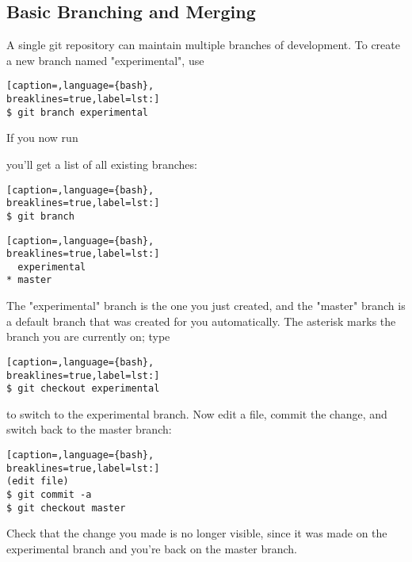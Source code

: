\subsection{Basic Branching and Merging}
A single git repository can maintain multiple branches of development. To
create a new branch named "experimental", use

\lstset{basicstyle=\scriptsize, numbers=none, captionpos=b, tabsize=4}
\begin{lstlisting}[caption=,language={bash},
breaklines=true,label=lst:]
$ git branch experimental
\end{lstlisting}

If you now run

you'll get a list of all existing branches:

\lstset{basicstyle=\scriptsize, numbers=none, captionpos=b, tabsize=4}
\begin{lstlisting}[caption=,language={bash},
breaklines=true,label=lst:]
$ git branch
\end{lstlisting}

\lstset{basicstyle=\scriptsize, numbers=none, captionpos=b, tabsize=4}
\begin{lstlisting}[caption=,language={bash},
breaklines=true,label=lst:]
  experimental
* master
\end{lstlisting}

The "experimental" branch is the one you just created, and the "master" branch
is a default branch that was created for you automatically. The asterisk marks
the branch you are currently on; type

\lstset{basicstyle=\scriptsize, numbers=none, captionpos=b, tabsize=4}
\begin{lstlisting}[caption=,language={bash},
breaklines=true,label=lst:]
$ git checkout experimental
\end{lstlisting}

to switch to the experimental branch. Now edit a file, commit the change, and
switch back to the master branch:

\lstset{basicstyle=\scriptsize, numbers=none, captionpos=b, tabsize=4}
\begin{lstlisting}[caption=,language={bash},
breaklines=true,label=lst:]
(edit file)
$ git commit -a
$ git checkout master
\end{lstlisting}

Check that the change you made is no longer visible, since it was made on the
experimental branch and you're back on the master branch.

